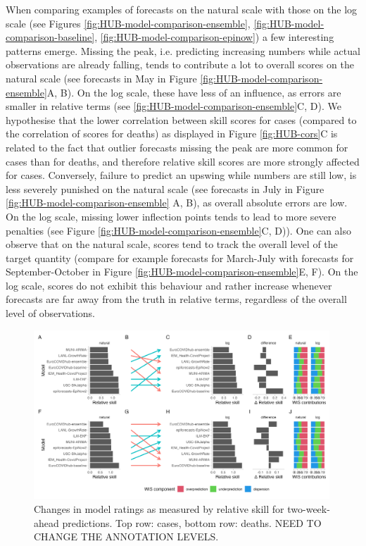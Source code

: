 \documentclass{article}
\begin{document}
When comparing examples of forecasts on the natural scale with those on the log scale (see Figures \ref{fig:HUB-model-comparison-ensemble}, \ref{fig:HUB-model-comparison-baseline}, \ref{fig:HUB-model-comparison-epinow}) a few interesting patterns emerge. Missing the peak, i.e. predicting increasing numbers while actual observations are already falling, tends to contribute a lot to overall scores on the natural scale (see forecasts in May in Figure \ref{fig:HUB-model-comparison-ensemble}A, B). On the log scale, these have less of an influence, as errors are smaller in relative terms (see \ref{fig:HUB-model-comparison-ensemble}C, D). We hypothesise that the lower correlation between skill scores for cases (compared to the correlation of scores for deaths) as displayed in Figure \ref{fig:HUB-cors}C is related to the fact that outlier forecasts missing the peak are more common for cases than for deaths, and therefore relative skill scores are more strongly affected for cases. 
Conversely, failure to predict an upswing while numbers are still low, is less severely punished on the natural scale (see forecasts in July in Figure \ref{fig:HUB-model-comparison-ensemble} A, B), as overall absolute errors are low. On the log scale, missing lower inflection points tends to lead to more severe penalties (see Figure \ref{fig:HUB-model-comparison-ensemble}C, D)). One can also observe that on the natural scale, scores tend to track the overall level of the target quantity (compare for example forecasts for March-July with forecasts for September-October in Figure \ref{fig:HUB-model-comparison-ensemble}E, F). On the log scale, scores do not exhibit this behaviour and rather increase whenever forecasts are far away from the truth in relative terms, regardless of the overall level of observations. 

\begin{figure}[h!]
    \centering
    \includegraphics[width=0.99\textwidth]{output/figures/HUB-pairwise-comparisons.png}
    \caption{Changes in model ratings as measured by relative skill for two-week-ahead predictions. Top row: cases, bottom row: deaths. NEED TO CHANGE THE ANNOTATION LEVELS.}
    \label{fig:HUB-rank-order}
\end{figure}
\end{document}
